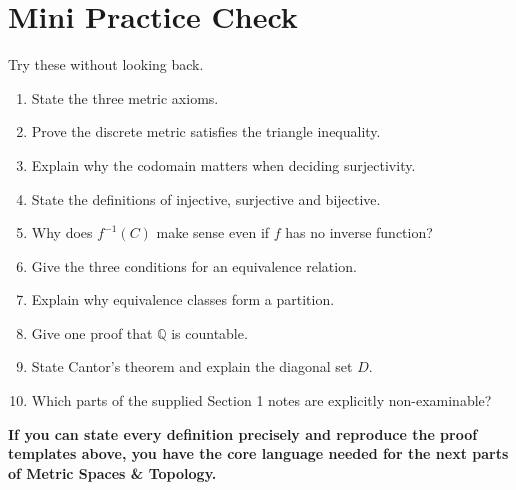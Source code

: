 \documentclass[11pt,a4paper]{article}
\newcommand{\Q}{\mathbb{Q}}
\begin{document}
\section{Mini Practice Check}
Try these without looking back.
\begin{enumerate}
\item State the three metric axioms.
\item Prove the discrete metric satisfies the triangle inequality.
\item Explain why the codomain matters when deciding surjectivity.
\item State the definitions of injective, surjective and bijective.
\item Why does $f^{-1}(C)$ make sense even if $f$ has no inverse function?
\item Give the three conditions for an equivalence relation.
\item Explain why equivalence classes form a partition.
\item Give one proof that $\Q$ is countable.
\item State Cantor's theorem and explain the diagonal set $D$.
\item Which parts of the supplied Section 1 notes are explicitly non-examinable?
\end{enumerate}

\begin{tcolorbox}[colback=navy!4,colframe=navy,arc=2mm]
\centering\large\bfseries\color{navy}
If you can state every definition precisely and reproduce the proof templates above, you have the core language needed for the next parts of Metric Spaces \& Topology.
\end{tcolorbox}
\end{document}
